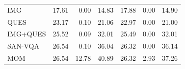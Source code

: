 \documentclass[10pt,twocolumn,letterpaper]{article}
\begin{document}
\begin{table}[t]
\begin{tabular}{@{}lrrr|rrr@{}}
IMG        & 17.61                                                                                                   & 0.00                                                                                                  & 14.83                                         & 17.88                                                                                                   & 0.00                                                                                                  & 14.90                                        \\
QUES       & 23.17                                                                                                   & 0.10                                                                                                  & 21.06                                         & 22.97                                                                                                   & 0.00                                                                                                  & 21.00                                        \\
IMG+QUES   & 25.52                                                                                                   & 0.09                                                                                                  & 32.01                                         & 25.49                                                                                                   & 0.00                                                                                                  & 32.01                                        \\
SAN-VQA    &  26.54                                                                                           &   0.10                                                                                               &36.04                                       &26.32                                                                                              &0.00                                                                                                  &36.14                                          \\ \midrule
MOM        & 26.54                                                                                                    & 12.78                                                                                                  &40.89                                 & 26.32                                                                                              &2.93                                                                                                  & 37.26                                          \\

\end{tabular}
\end{table}
\end{document}

